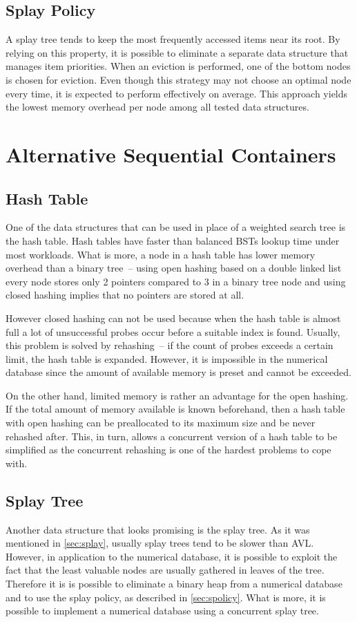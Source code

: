 \subsection{Splay Policy}
\label{sssec:spolicy}
A splay tree tends to keep the most frequently accessed items near its root. By relying on this property, it is possible to eliminate a separate data structure that manages item priorities. When an eviction is performed, one of the bottom nodes is chosen for eviction. Even though this strategy may not choose an optimal node every time, it is expected to perform effectively on average. This approach yields the lowest memory overhead per node among all tested data structures.


\section{Alternative Sequential Containers}

\subsection{Hash Table}
One of the data structures that can be used in place of a weighted search tree is the hash table. Hash tables have faster than balanced BSTs lookup time under most workloads. What is more, a node in a hash table has lower memory overhead than a binary tree~-- using open hashing based on a double linked list every node stores only 2 pointers compared to 3 in a binary tree node and using closed hashing implies that no pointers are stored at all.

However closed hashing can not be used because when the hash table is almost full a lot of unsuccessful probes occur before a suitable index is found. Usually, this problem is solved by rehashing~-- if the count of probes exceeds a certain limit, the hash table is expanded. However, it is impossible in the numerical database since the amount of available memory is preset and cannot be exceeded.

On the other hand, limited memory is rather an advantage for the open hashing. If the total amount of memory available is known beforehand, then a hash table with open hashing can be preallocated to its maximum size and be never rehashed after. This, in turn, allows a concurrent version of a hash table to be simplified as the concurrent rehashing is one of the hardest problems to cope with.

\subsection{Splay Tree}
Another data structure that looks promising is the splay tree.
As it was mentioned in \cref{sec:splay}, usually splay trees tend to be slower than AVL. However, in application to the numerical database, it is possible to exploit the fact that the least valuable nodes are usually gathered in leaves of the tree. Therefore it is is possible to eliminate a binary heap from a numerical database and to use the splay policy, as described in \cref{sec:spolicy}. What is more, it is possible to implement a numerical database using a concurrent splay tree\cite{cb_tree}.

